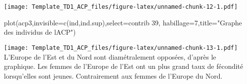 \documentclass[
]{article}
\newenvironment{Shaded}{\begin{snugshade}}{\end{snugshade}}
\newcommand{\AttributeTok}[1]{\textcolor[rgb]{0.77,0.63,0.00}{#1}}
\newcommand{\DecValTok}[1]{\textcolor[rgb]{0.00,0.00,0.81}{#1}}
\newcommand{\FunctionTok}[1]{\textcolor[rgb]{0.00,0.00,0.00}{#1}}
\newcommand{\NormalTok}[1]{#1}
\newcommand{\StringTok}[1]{\textcolor[rgb]{0.31,0.60,0.02}{#1}}
\begin{document}
\texttt{[image: Template\_TD1\_ACP\_files/figure-latex/unnamed-chunk-12-1.pdf]}

\begin{Shaded}
\begin{Highlighting}[]
\FunctionTok{plot}\NormalTok{(acp3,}\AttributeTok{invisible=}\FunctionTok{c}\NormalTok{(}\StringTok{\textquotesingle{}ind\textquotesingle{}}\NormalTok{,}\StringTok{\textquotesingle{}ind.sup\textquotesingle{}}\NormalTok{),}\AttributeTok{select=}\StringTok{\textquotesingle{}contrib  39\textquotesingle{}}\NormalTok{,}
     \AttributeTok{habillage=}\DecValTok{7}\NormalTok{,}\AttributeTok{title=}\StringTok{"Graphe des individus de l\textquotesingle{}ACP"}\NormalTok{)}
\end{Highlighting}
\end{Shaded}

\texttt{[image: Template\_TD1\_ACP\_files/figure-latex/unnamed-chunk-13-1.pdf]}
L'Europe de l'Est et du Nord sont diamétralement opposées, d'après le
graphique. Les femmes de l'Europe de l'Est ont un plus grand taux de
fécondité lorsqu'elles sont jeunes. Contrairement aux femmes de l'Europe
du Nord.
\end{document}

